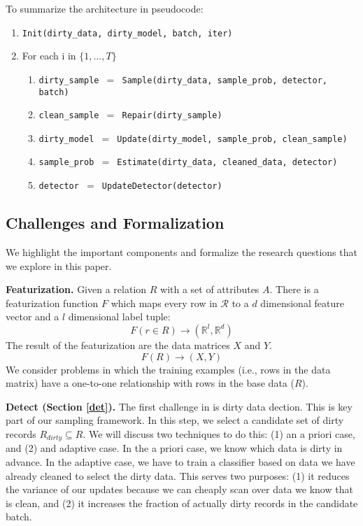 To summarize the architecture in pseudocode:
\begin{enumerate}\scriptsize\sloppy
\item \texttt{Init(dirty\_data, dirty\_model, batch, iter)}
\item For each i in $\{1,...,T\}$
\begin{enumerate}
	\item \texttt{dirty\_sample $=$ Sample(dirty\_data, sample\_prob, detector, batch)}
	\item \texttt{clean\_sample $=$ Repair(dirty\_sample)}
	\item \texttt{dirty\_model $=$ Update(dirty\_model, sample\_prob, clean\_sample)}
	\item \texttt{sample\_prob $=$ Estimate(dirty\_data, cleaned\_data, detector)}
	\item \texttt{detector $=$ UpdateDetector(detector)}
\end{enumerate}
\end{enumerate}

\subsection{Challenges and Formalization}
We highlight the important components and formalize the research questions that we explore in this paper. 

\vspace{0.5em}

\noindent \textbf{Featurization. } Given a relation $R$ with a set of attributes $A$.
There is a featurization function $F$ which maps every row in $\mathcal{R}$ to a $d$ dimensional feature vector and a $l$ dimensional label tuple: 
\[F(r \in R) \rightarrow (\mathbb{R}^l, \mathbb{R}^d)\]
The result of the featurization are the data matrices $X$ and $Y$.
\[
F(R)\rightarrow (X,Y)
\]
We consider problems in which the training examples (i.e., rows in the data matrix) have a one-to-one relationship with rows in the base data ($R$).

\vspace{0.5em}

\noindent\textbf{Detect (Section \ref{det}). } The first challenge in \sys is dirty data dection. This is key part of our sampling framework. In this step, we select a candidate set of dirty records $R_{dirty} \subseteq R$. We will discuss two techniques to do this: (1) an a priori case, and (2) and adaptive case. In the a priori case, we know which data is dirty in advance. In the adaptive case, we have to train a classifier based on data we have already cleaned to select the dirty data. This serves two purposes: (1) it reduces the variance of our updates because we can cheaply scan over data we know that is clean, and (2) it increases the fraction of actually dirty records in the candidate batch.

